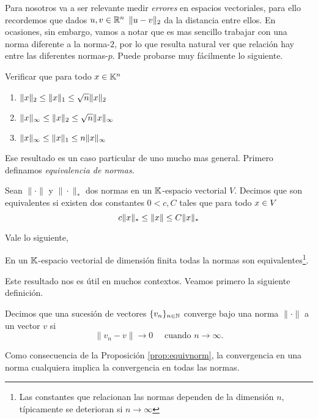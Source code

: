 %
Para nosotros va a ser relevante medir \emph{errores} en espacios vectoriales, para ello recordemos que dados $\ub,\vb\in \R^n$
$\|\ub-\vb\|_2$ da la distancia entre ellos. En ocasiones, sin embargo, vamos a notar que es mas sencillo trabajar con una norma diferente a la norma-$2$, por lo que resulta natural ver que relación hay entre las diferentes normas-$p$. Puede probarse muy fácilmente lo siguiente.
\begin{ej}
Verificar que para todo $\xb\in \K^n$
\begin{enumerate}
\item $\|\xb\|_2 \le \|\xb\|_1 \le \sqrt{n} \|\xb\|_2$
\item $\|\xb\|_\infty \le \|\xb\|_2 \le \sqrt{n} \|\xb\|_\infty$
\item $\|\xb\|_\infty \le \|\xb\|_1 \le n \|\xb\|_\infty$
\end{enumerate}
\end{ej}
Ese resultado es un caso particular de uno mucho mas general. Primero definamos \emph{equivalencia de normas}.
\tccdefi
\begin{defi}
 Sean $\|\cdot\|$ y $\|\cdot\|_{*}$ dos normas en un $\mathbb K$-espacio vectorial $V$. Decimos que son equivalentes si existen dos constantes $0<c,C$ tales que para todo $\xb\in V$
 $$
 c\|\xb\|_* \le \|\xb\| \le C \|\xb\|_*
 $$
\end{defi}
\etcc
Vale lo siguiente,
\begin{prop}
\label{prop:equivnorm}
 En un $\mathbb K$-espacio vectorial de dimensión finita todas la normas son equivalentes\footnote{Las constantes que relacionan las normas dependen de la dimensión $n$, típicamente se deterioran si $n\to \infty$}.
\end{prop}
Este resultado nos es útil en muchos contextos.  Veamos primero la siguiente definición.
\tccdefi
\begin{defi}
Decimos que una sucesi\'on de vectores $\{v_n\}_{n \in \mathbb N}$ converge bajo una norma $\|\cdot\|$ a un vector $v$ si
$$
\|v_n - v\| \rightarrow 0 \quad \text{ cuando } n \rightarrow \infty.
$$
\end{defi}
\etcc
Como consecuencia de la Proposición \ref{prop:equivnorm}, la convergencia en una norma cualquiera implica la convergencia en todas las normas.

